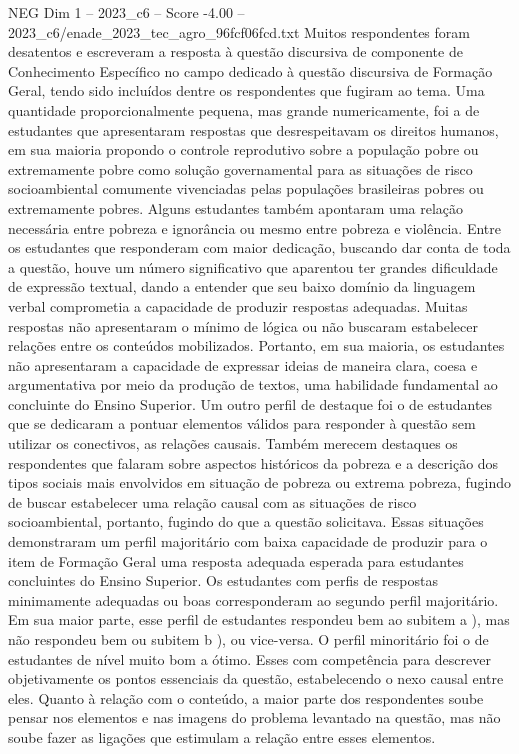 \begin{textsample}{NEG Dim 1 – 2023\_c6 – Score -4.00 – 2023\_c6/enade\_2023\_tec\_agro\_96fcf06fcd.txt}
Muitos respondentes foram desatentos e escreveram a resposta à questão discursiva de componente de Conhecimento Específico no campo dedicado à questão discursiva de Formação Geral, tendo sido incluídos dentre os respondentes que fugiram ao tema.
Uma quantidade proporcionalmente pequena, mas grande numericamente, foi a de estudantes que apresentaram respostas que desrespeitavam os direitos humanos, em sua maioria propondo o controle reprodutivo sobre a população pobre ou extremamente pobre como solução governamental para as situações de risco socioambiental comumente vivenciadas pelas populações brasileiras pobres ou extremamente pobres.
Alguns estudantes também apontaram uma relação necessária entre pobreza e ignorância ou mesmo entre pobreza e violência.
Entre os estudantes que responderam com maior dedicação, buscando dar conta de toda a questão, houve um número significativo que aparentou ter grandes dificuldade de expressão textual, dando a entender que seu baixo domínio da linguagem verbal comprometia a capacidade de produzir respostas adequadas.
Muitas respostas não apresentaram o mínimo de lógica ou não buscaram estabelecer relações entre os conteúdos mobilizados.
Portanto, em sua maioria, os estudantes não apresentaram a capacidade de expressar ideias de maneira clara, coesa e argumentativa por meio da produção de textos, uma habilidade fundamental ao concluinte do Ensino Superior.
Um outro perfil de destaque foi o de estudantes que se dedicaram a pontuar elementos válidos para responder à questão sem utilizar os conectivos, as relações causais.
Também merecem destaques os respondentes que falaram sobre aspectos históricos da pobreza e a descrição dos tipos sociais mais envolvidos em situação de pobreza ou extrema pobreza, fugindo de buscar estabelecer uma relação causal com as situações de risco socioambiental, portanto, fugindo do que a questão solicitava.
Essas situações demonstraram um perfil majoritário com baixa capacidade de produzir para o item de Formação Geral uma resposta adequada esperada para estudantes concluintes do Ensino Superior.
Os estudantes com perfis de respostas minimamente adequadas ou boas corresponderam ao segundo perfil majoritário.
Em sua maior parte, esse perfil de estudantes respondeu bem ao subitem a ), mas não respondeu bem ou subitem b ), ou vice-versa.
O perfil minoritário foi o de estudantes de nível muito bom a ótimo.
Esses com competência para descrever objetivamente os pontos essenciais da questão, estabelecendo o nexo causal entre eles.
Quanto à relação com o conteúdo, a maior parte dos respondentes soube pensar nos elementos e nas imagens do problema levantado na questão, mas não soube fazer as ligações que estimulam a relação entre esses elementos.

\end{textsample}
